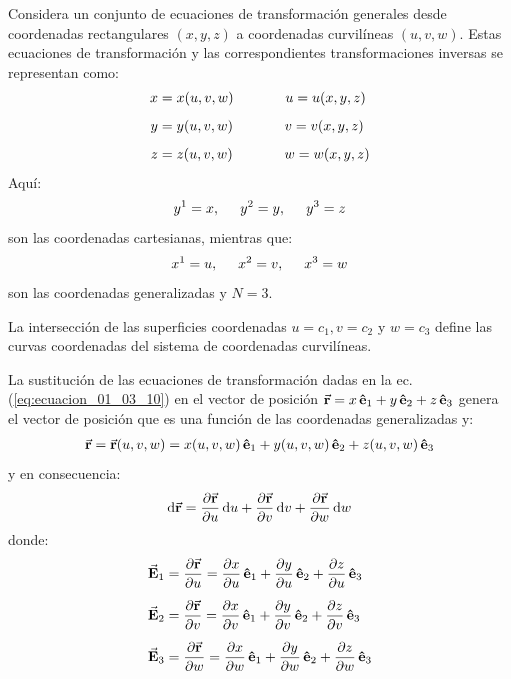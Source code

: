 \documentclass[hidelinks,12pt]{article}
\begin{document}
Considera un conjunto de ecuaciones de transformación generales desde coordenadas rectangulares $(x, y, z)$ a coordenadas curvilíneas $(u, v, w)$. Estas ecuaciones de transformación y las correspondientes transformaciones inversas se representan como:
\begin{align}
\begin{aligned}
x &= x(u, v, w) \hspace{1.3cm} u = u(x, y, z) \\[0.5em]
y &= y(u, v, w) \hspace{1.3cm} v = v(x, y, z) \\[0.5em]
z &= z(u, v, w) \hspace{1.3cm} w = w(x, y, z)
\end{aligned}
\label{eq:ecuacion_01_03_10}
\end{align}
Aquí: 
\begin{align*}
y^{1} = x, \hspace{0.5cm} y^{2} = y, \hspace{0.5cm} y^{3} = z
\end{align*}
son las coordenadas cartesianas, mientras que:
\begin{align*}
x^{1} = u, \hspace{0.5cm} x^{2} = v, \hspace{0.5cm} x^{3} = w
\end{align*}
son las coordenadas generalizadas y $N = 3$.
\par
La intersección de las superficies coordenadas $u = c_{1}, v = c_{2}$ y $w = c_{3}$ define las curvas coordenadas del sistema de coordenadas curvilíneas.
\par
La sustitución de las ecuaciones de transformación dadas en la ec. (\ref{eq:ecuacion_01_03_10}) en el vector de posición $\va{r} = x\, \vu{e}_{1} + y\, \vu{e}_{2} + z\, \vu{e}_{3}$ genera el vector de posición que es una función de las coordenadas generalizadas y:
\begin{align*}
\va{r} = \va{r} (u, v, w) = x (u, v, w) \, \vu{e}_{1} + y (u, v, w) \, \vu{e}_{2} + z (u, v, w) \, \vu{e}_{3}
\end{align*}
y en consecuencia:
\begin{align*}
\dd{\va{r}} = \pdv{\va{r}}{u} \dd{u} + \pdv{\va{r}}{v} \dd{v} + \pdv{\va{r}}{w} \dd{w}
\end{align*}
donde:
\begin{align}
\begin{aligned}
\va{E}_{1} &= \pdv{\va{r}}{u} = \pdv{x}{u} \, \vu{e}_{1} + \pdv{y}{u} \, \vu{e}_{2} + \pdv{z}{u} \, \vu{e}_{3} \\[0.5em]
\va{E}_{2} &= \pdv{\va{r}}{v} = \pdv{x}{v} \, \vu{e}_{1} + \pdv{y}{v} \, \vu{e}_{2} + \pdv{z}{v} \, \vu{e}_{3} \\[0.5em]
\va{E}_{3} &= \pdv{\va{r}}{w} = \pdv{x}{w} \, \vu{e}_{1} + \pdv{y}{w} \, \vu{e}_{2} + \pdv{z}{w} \, \vu{e}_{3}
\end{aligned}
\label{eq:ecuacion_01_03_11}
\end{align}
\end{document}
